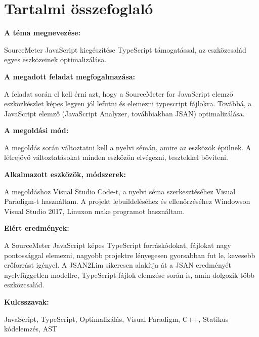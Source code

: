 \chapter*{Tartalmi összefoglaló}

\noindent\textbf{A téma megnevezése:}

SourceMeter JavaScript kiegészítése TypeScript támogatással, az eszközcsalád egyes eszközeinek optimalizálása.

\noindent\textbf{A megadott feladat megfogalmazása:}

A feladat során el kell érni azt, hogy a SourceMeter for JavaScript elemző eszközkészlet képes legyen jól lefutni és elemezni typescript fájlokra.
Továbbá, a JavaScript elemző (JavaScript Analyzer, továbbiakban JSAN) optimalizálása.

\noindent\textbf{A megoldási mód:}

A megoldás során változtatni kell a nyelvi sémán, amire az eszközök épülnek. A létrejövő változtatásokat minden eszközön elvégezni, tesztekkel bővíteni.

\noindent\textbf{Alkalmazott eszközök, módszerek:}

A megoldáshoz Visual Studio Code-t, a nyelvi séma szerkesztéséhez Visual Paradigm-t használtam.
A projekt lebuildeléséhez és ellenőrzéséhez Windowson Visual Studio 2017, Linuxon make programot használtam.

\noindent\textbf{Elért eredmények:}

A SourceMeter JavaScript képes TypeScript forráskódokat, fájlokat nagy pontossággal elemezni, nagyobb projektre lényegesen gyorsabban fut le, kevesebb erőforrást igényel.
A JSAN2Lim sikeresen alakítja át a JSAN eredményét nyelvfüggetlen modellre, TypeScript fájlok elemzése során is, amin dolgozik több eszközcsalád.

\noindent\textbf{Kulcsszavak:}

JavaScript, TypeScript, Optimalizálás, Visual Paradigm, C++, Statikus kódelemzés, AST
